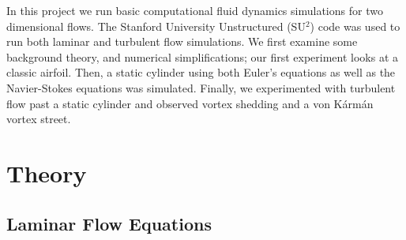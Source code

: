 \documentclass[10pt, titlepage]{article}
\begin{document}
In this project we run basic computational fluid dynamics simulations for two dimensional flows. The Stanford University Unstructured (SU$^2$) code was used to run both laminar and turbulent flow simulations. We first examine some background theory, and numerical simplifications; our first experiment looks at a classic airfoil. Then, a static cylinder using both Euler's equations as well as the Navier-Stokes equations was simulated. Finally, we experimented with turbulent flow past a static cylinder and observed vortex shedding and a von K\'{a}rm\'{a}n vortex street.

\newpage

\section{Theory}
\subsection{Laminar Flow Equations}
\end{document}
